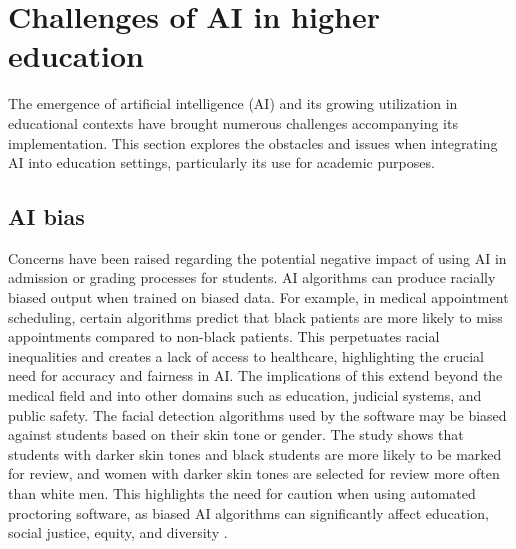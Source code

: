 
\section{Challenges of AI in higher education}
The emergence of artificial intelligence (AI) and its growing utilization in educational
contexts have brought numerous challenges accompanying its implementation.  This section explores the obstacles
and issues when integrating AI into education settings, particularly its use for academic purposes.
\subsection{AI bias}
Concerns have been raised regarding the potential negative impact of using AI in admission or
grading processes for students. AI algorithms can produce racially biased output when trained on biased data.
For example, in medical appointment scheduling, certain algorithms predict that black patients are more likely
to miss appointments compared to non-black patients. This perpetuates racial inequalities and creates a lack of
access to healthcare, highlighting the crucial need for accuracy and fairness in AI. The implications of this
extend beyond the medical field and into other domains such as education, judicial systems, and public safety\citep{shanklin_ethical_2022}.
The facial detection algorithms used by the software may be biased against students based on their skin tone or gender.
The study shows that students with darker skin tones and black students are more likely to be marked for review, and women
with darker skin tones are selected for review more often than white men. This highlights the need for caution when using
automated proctoring software, as biased AI algorithms can significantly affect education, social justice, equity, and diversity
\citep{yoder-himes_racial_2022}.

